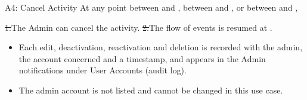 \begin{flowblock}{A4: Cancel Activity}
At any point between  and , between  and , or between  and ,\par
\st{1.}{The Admin can cancel the activity.}
\st{2.}{The flow of events is resumed at .}
\end{flowblock}
\begin{itemize}
  \item Each edit, deactivation, reactivation and deletion is recorded with the admin, the account concerned and a timestamp, and appears in the Admin notifications under User Accounts (audit log).
  \item The admin account is not listed and cannot be changed in this use case.
\end{itemize}

